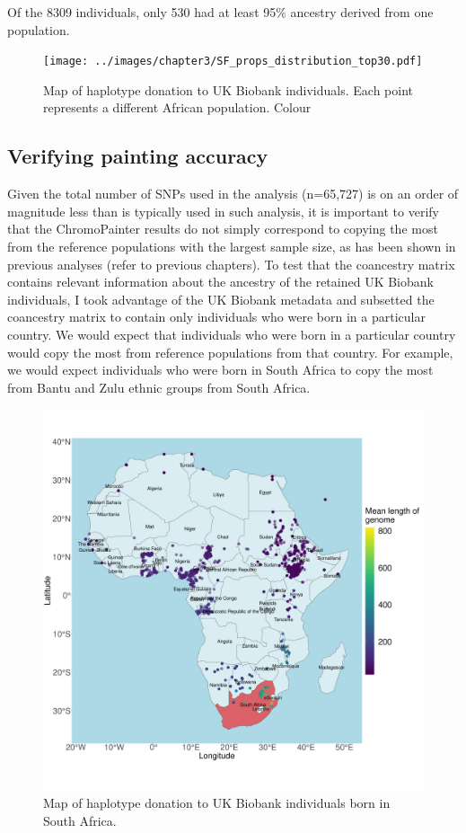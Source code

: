 Of the 8309 individuals, only 530 had at least 95\% ancestry derived from one population. 

\begin{figure}[htp]
    \centering
    \texttt{[image: ../images/chapter3/SF\_props\_distribution\_top30.pdf]}
    \caption{Map of haplotype donation to UK Biobank individuals. Each point represents a different African population. Colour }
    \label{fig:SF_props_distribution_top30}
\end{figure}


\subsection{Verifying painting accuracy}

Given the total number of SNPs used in the analysis (n=65,727) is on an order of magnitude less than is typically used in such analysis, it is important to verify that the ChromoPainter results do not simply correspond to copying the most from the reference populations with the largest sample size, as has been shown in previous analyses (refer to previous chapters). To test that the coancestry matrix contains relevant information about the ancestry of the retained UK Biobank individuals, I took advantage of the UK Biobank metadata and subsetted the coancestry matrix to contain only individuals who were born in a particular country. We would expect that individuals who were born in a particular country would copy the most from reference populations from that country. For example, we would expect individuals who were born in South Africa to copy the most from Bantu and Zulu ethnic groups from South Africa. 

\begin{figure}[htp]
    \centering
    \includegraphics[width=1.0\textwidth]{../images/chapter3/haplotype_map_SouthAfrica.pdf}
    \caption{Map of haplotype donation to UK Biobank individuals born in South Africa.}
    \label{fig:haplotype_map_SouthAfrica}
\end{figure}

